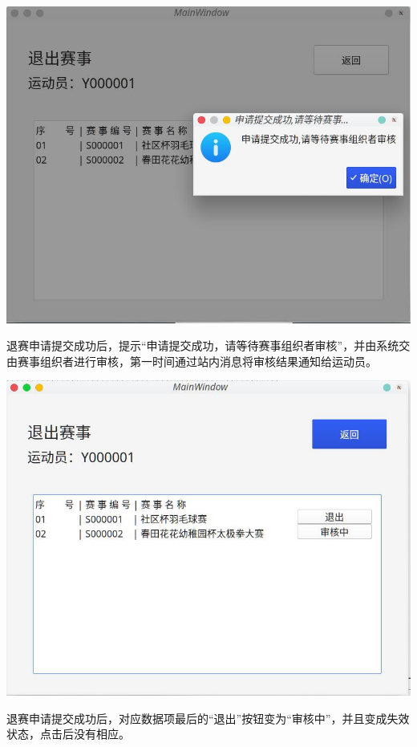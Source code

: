 \documentclass[a4paper,UTF8]{article}
\begin{document}
{\centering\includegraphics[width=1\columnwidth]{14.png}
	
}

退赛申请提交成功后，提示“申请提交成功，请等待赛事组织者审核”，并由系统交由赛事组织者进行审核，第一时间通过站内消息将审核结果通知给运动员。


{\centering\includegraphics[width=1\columnwidth]{15.png}
	
}

退赛申请提交成功后，对应数据项最后的“退出”按钮变为“审核中”，并且变成失效状态，点击后没有相应。
\end{document}

